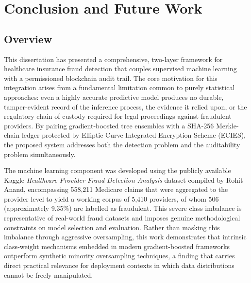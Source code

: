
\chapter{Conclusion and Future Work}

\section{Overview}

This dissertation has presented a comprehensive, two-layer framework for healthcare insurance fraud detection that couples supervised machine learning with a permissioned blockchain audit trail. The core motivation for this integration arises from a fundamental limitation common to purely statistical approaches: even a highly accurate predictive model produces no durable, tamper-evident record of the inference process, the evidence it relied upon, or the regulatory chain of custody required for legal proceedings against fraudulent providers. By pairing gradient-boosted tree ensembles with a SHA-256 Merkle-chain ledger protected by Elliptic Curve Integrated Encryption Scheme (ECIES), the proposed system addresses both the detection problem and the auditability problem simultaneously.

The machine learning component was developed using the publicly available Kaggle \textit{Healthcare Provider Fraud Detection Analysis} dataset compiled by Rohit Anand, encompassing 558,211 Medicare claims that were aggregated to the provider level to yield a working corpus of 5,410 providers, of whom 506 (approximately 9.35\%) are labelled as fraudulent. This severe class imbalance is representative of real-world fraud datasets and imposes genuine methodological constraints on model selection and evaluation. Rather than masking this imbalance through aggressive oversampling, this work demonstrates that intrinsic class-weight mechanisms embedded in modern gradient-boosted frameworks outperform synthetic minority oversampling techniques, a finding that carries direct practical relevance for deployment contexts in which data distributions cannot be freely manipulated.

